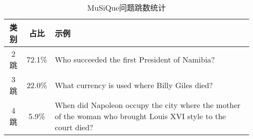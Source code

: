 \begin{table}[htbp]
    \centering
    \caption{MuSiQue问题跳数统计}
    \label{tab:2-4}
    \begin{tabular}{c|c|p{}}
        \hline
        类别 & 占比 & 示例 \\
        \hline
        2跳 & 72.1\% & Who succeeded the first President of Namibia? \\
        3跳 & 22.0\% & What currency is used where Billy Giles died? \\
        4跳 & 5.9\% & When did Napoleon occupy the city where the mother of the woman who brought Louis XVI style to the court died? \\
        \hline
    \end{tabular}
\end{table}

